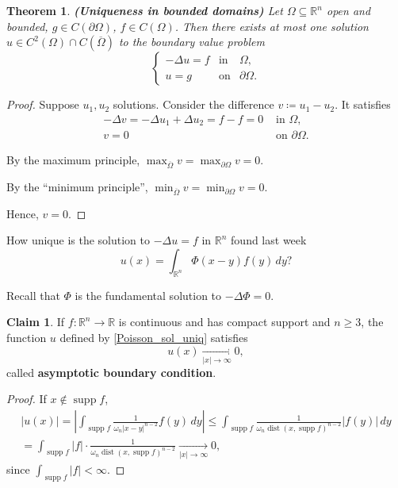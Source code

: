 \documentclass[12pt]{article}
\DeclareMathOperator{\supp}{supp}
\DeclareMathOperator{\dist}{dist}
\newtheorem{theorem}{Theorem}[section]
\theoremstyle{definition}
\newtheorem*{claim*}{Claim}
\begin{document}
\begin{theorem}
\emph{\textbf{(Uniqueness in bounded domains)}} Let $\Omega\subseteq\mathbb R^n$ open and bounded, $g\in C(\partial\Omega)$, $f\in C(\Omega)$. Then there exists at most one solution $u\in C^2(\Omega)\cap C(\overline\Omega)$ to the boundary value problem
\[\left\{\begin{array}{lll}-\Delta u=f&\text{in}&\Omega,\\u=g&\text{on}&\partial\Omega.\end{array}\right.\]
\end{theorem}

\begin{proof}
Suppose $u_1,u_2$ solutions. Consider the difference $v\coloneqq u_1-u_2$. It satisfies
\[
\begin{array}{cl}
-\Delta v=-\Delta u_1+\Delta u_2=f-f=0&\text{ in }\Omega,\\
v=0&\text{ on }\partial\Omega.
\end{array}
\]

By the maximum principle, $\max_{\overline\Omega}v=\max_{\partial\Omega}v=0$.

By the ``minimum principle'', $\min_{\overline\Omega}v=\min_{\partial\Omega}v=0$.

Hence, $v=0$.
\end{proof}

How unique is the solution to $-\Delta u=f$ in $\mathbb R^n$ found last week
\begin{equation}\tag{1}\label{Poisson_sol_uniq}
u(x)=\int_{\mathbb R^n}\Phi(x-y)f(y)\,dy?
\end{equation}

Recall that $\Phi$ is the fundamental solution to $-\Delta\Phi=0$.

\begin{claim*}
If $f:\mathbb R^n\rightarrow\mathbb R$ is continuous and has compact support and $n\geq3$, the function $u$ defined by \eqref{Poisson_sol_uniq} satisfies
\[u(x)\xrightarrow[|x|\to\infty]{}0,\]
called \textbf{asymptotic boundary condition}.
\end{claim*}

\begin{proof}
If $x\notin\supp f$,
\begin{multline*}
|u(x)|=\left|\int_{\supp f}\frac1{\omega_n|x-y|^{n-2}}f(y)\,dy\right|\leq\int_{\supp f}\frac1{\omega_n\dist(x,\supp f)^{n-2}}\big|f(y)\big|\,dy\\
=\int_{\supp f}|f|\cdot\frac1{\omega_n\dist(x,\supp f)^{n-2}}\xrightarrow[|x|\to\infty]{}0,
\end{multline*}
since $\int_{\supp f}|f|<\infty$.
\end{proof}
\end{document}
